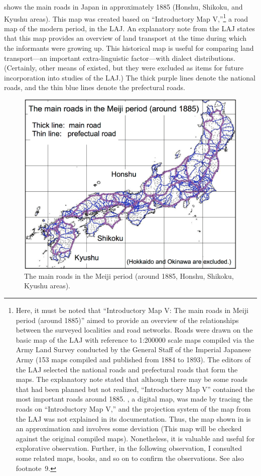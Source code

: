 \documentclass[output=paper]{LSP/langsci}
\begin{document}
 shows the main roads in Japan in approximately 1885 (Honshu, Shikoku, and Kyushu areas). This map was created based on “Introductory Map V,”\footnote{ Here, it must be noted that “Introductory Map V: The main roads in Meiji period (around 1885)” aimed to provide an overview of the relationships between the surveyed localities and road networks. Roads were drawn on the basic map of the LAJ with reference to 1:200000 scale maps compiled via the Army Land Survey conducted by the General Staff of the Imperial Japanese Army (153 maps compiled and published from 1884 to 1893). The editors of the LAJ selected the national roads and prefectural roads that form the maps. The explanatory note stated that although there may be some roads that had been planned but not realized, “Introductory Map V” contained the most important roads around 1885. , a digital map, was made by tracing the roads on “Introductory Map V,” and the projection system of the map from the LAJ was not explained in its documentation. Thus, the map shown in  is an approximation and involves some deviation (This map will be checked against the original compiled maps). Nonetheless, it is valuable and useful for explorative observation. Further, in the following observation, I consulted some related maps, books, and so on to confirm the observations. See also footnote~9.} a road map of the modern period, in the LAJ. An explanatory note from the LAJ states that this map provides an overview of land transport at the time during which the informants were growing up. This historical map is useful for comparing land transport—an important extra-linguistic factor—with dialect distributions. (Certainly, other means of  existed, but they were excluded as items for future incorporation into studies of the LAJ.) The thick purple lines denote the national roads, and the thin blue lines denote the prefectural roads.

\begin{figure}
\includegraphics[height=0.4\textheight]{illustrations/kuma_fig07}
\caption{The main roads in the Meiji period (around 1885, Honshu, Shikoku, Kyushu areas).}          
\label{fig:kuma:7}
\end{figure} 
\end{document}

